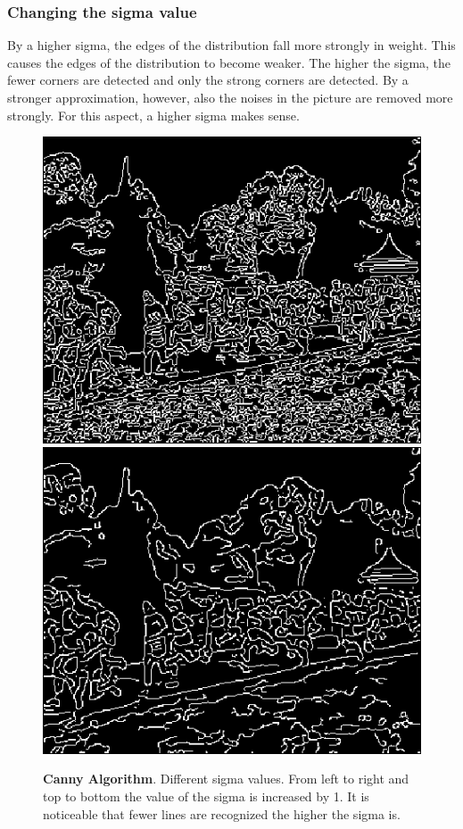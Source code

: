 \documentclass{article}
\begin{document}
	\subsubsection{Changing the sigma value}
	By a higher sigma, the edges of the distribution fall more strongly in weight. This causes the edges of the distribution to become weaker. 
	The higher the sigma, the fewer corners are detected and only the strong corners are detected. By a stronger approximation, 
	however, also the noises in the picture are removed more strongly. For this aspect, a higher sigma makes sense.
	\begin{figure}[!h]
		\center
		\caption{\textbf{Canny Algorithm}. Different sigma values. From left to right and top to bottom the value of the sigma is increased by 1. It is noticeable that fewer lines are recognized the higher the sigma is.}
		\includegraphics[scale=0.5]{E_canny_s1.png}
		\includegraphics[scale=0.5]{E_canny_s2.png}

\end{figure}
\end{document}
